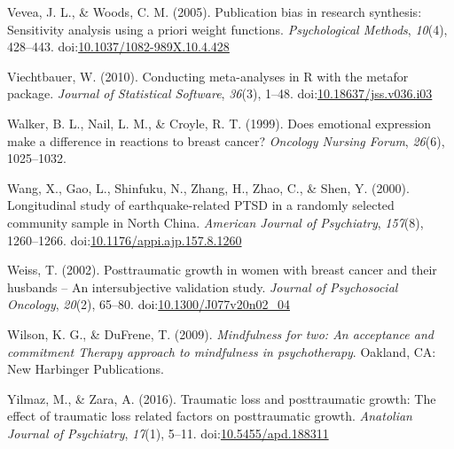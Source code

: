 \documentclass[english,man, mask]{apa6}
\theoremstyle{definition}
\theoremstyle{definition}
\theoremstyle{definition}
\theoremstyle{remark}
\begin{document}
\hypertarget{ref-Vevea2005}{}
Vevea, J. L., \& Woods, C. M. (2005). Publication bias in research
synthesis: Sensitivity analysis using a priori weight functions.
\emph{Psychological Methods}, \emph{10}(4), 428--443.
doi:\href{https://doi.org/10.1037/1082-989X.10.4.428}{10.1037/1082-989X.10.4.428}

\hypertarget{ref-Viechtbauer2010}{}
Viechtbauer, W. (2010). Conducting meta-analyses in R with the metafor
package. \emph{Journal of Statistical Software}, \emph{36}(3), 1--48.
doi:\href{https://doi.org/10.18637/jss.v036.i03}{10.18637/jss.v036.i03}

\hypertarget{ref-Walker1999a}{}
Walker, B. L., Nail, L. M., \& Croyle, R. T. (1999). Does emotional
expression make a difference in reactions to breast cancer?
\emph{Oncology Nursing Forum}, \emph{26}(6), 1025--1032.

\hypertarget{ref-Wang2000}{}
Wang, X., Gao, L., Shinfuku, N., Zhang, H., Zhao, C., \& Shen, Y.
(2000). Longitudinal study of earthquake-related PTSD in a randomly
selected community sample in North China. \emph{American Journal of
Psychiatry}, \emph{157}(8), 1260--1266.
doi:\href{https://doi.org/10.1176/appi.ajp.157.8.1260}{10.1176/appi.ajp.157.8.1260}

\hypertarget{ref-Weiss2002}{}
Weiss, T. (2002). Posttraumatic growth in women with breast cancer and
their husbands -- An intersubjective validation study. \emph{Journal of
Psychosocial Oncology}, \emph{20}(2), 65--80.
doi:\href{https://doi.org/10.1300/J077v20n02_04}{10.1300/J077v20n02\_04}

\hypertarget{ref-Wilson2009}{}
Wilson, K. G., \& DuFrene, T. (2009). \emph{Mindfulness for two: An
acceptance and commitment Therapy approach to mindfulness in
psychotherapy}. Oakland, CA: New Harbinger Publications.

\hypertarget{ref-Yilmaz2016}{}
Yilmaz, M., \& Zara, A. (2016). Traumatic loss and posttraumatic growth:
The effect of traumatic loss related factors on posttraumatic growth.
\emph{Anatolian Journal of Psychiatry}, \emph{17}(1), 5--11.
doi:\href{https://doi.org/10.5455/apd.188311}{10.5455/apd.188311}
\end{document}
